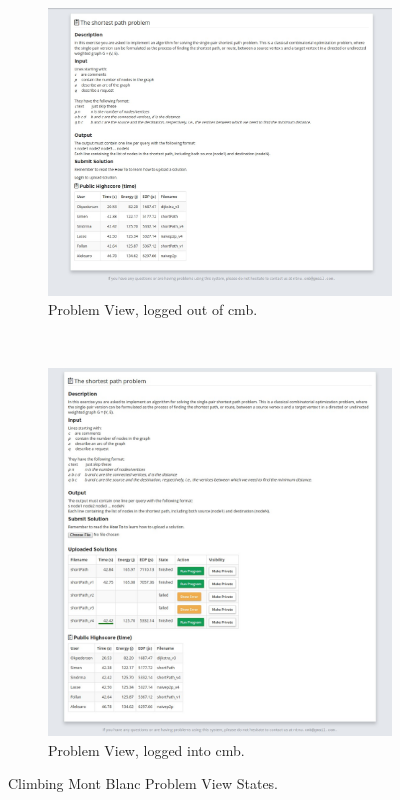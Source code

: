 \begin{figure}
    \centering
    \begin{subfigure}[b]{0.82\textwidth}
        \includegraphics[width=\textwidth]{figs/problem.jpg}
        \caption{Problem View, logged out of \gls{cmb}.}
        \label{fig:problem}
    \end{subfigure}
    ~ %
    \begin{subfigure}[b]{0.82\textwidth}
        \includegraphics[width=\textwidth]{figs/problem_loggedin.jpg}
        \caption{Problem View, logged into \gls{cmb}.}
        \label{fig:problem-loggedin}
    \end{subfigure}
    \caption{Climbing Mont Blanc Problem View States.}\label{fig:problem-view}
\end{figure}

